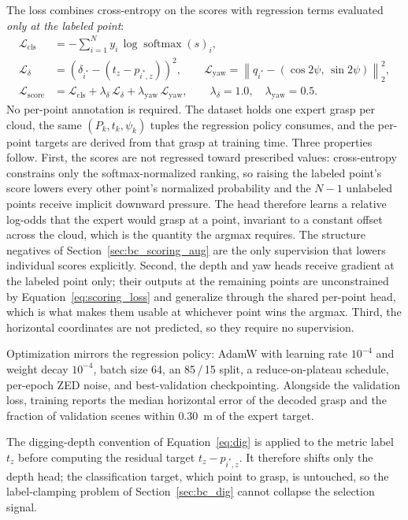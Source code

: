 The loss combines cross-entropy on the scores with regression terms evaluated
\emph{only at the labeled point}:
\begin{align}
  \mathcal{L}_{\mathrm{cls}} &= - \sum_{i=1}^{N} y_i \,
      \log \operatorname{softmax}(s)_i, \\
  \mathcal{L}_{\delta} &= \left( \delta_{i^*} - \left( t_z - p_{i^*, z} \right) \right)^2, \qquad
  \mathcal{L}_{\mathrm{yaw}} = \left\lVert q_{i^*} -
      \left( \cos 2\psi,\, \sin 2\psi \right) \right\rVert_2^2, \\
  \mathcal{L}_{\mathrm{score}} &= \mathcal{L}_{\mathrm{cls}}
      + \lambda_\delta \, \mathcal{L}_{\delta}
      + \lambda_{\mathrm{yaw}} \, \mathcal{L}_{\mathrm{yaw}},
  \qquad \lambda_\delta = 1.0, \quad \lambda_{\mathrm{yaw}} = 0.5 .
  \label{eq:scoring_loss}
\end{align}
No per-point annotation is required. The dataset holds one expert grasp per
cloud, the same $(P_k, t_k, \psi_k)$ tuples the regression policy consumes,
and the per-point targets are derived from that grasp at training time.
Three properties follow. First, the scores are not regressed toward
prescribed values: cross-entropy constrains only the softmax-normalized
ranking, so raising the labeled point's score lowers every other point's
normalized probability and the $N - 1$ unlabeled points receive implicit
downward pressure. The head therefore learns a relative log-odds that the
expert would grasp at a point, invariant to a constant offset across the
cloud, which is the quantity the argmax requires. The structure negatives of
Section~\ref{sec:bc_scoring_aug} are the only supervision that lowers
individual scores explicitly. Second, the depth and yaw heads receive
gradient at the labeled point only; their outputs at the remaining points
are unconstrained by Equation~\eqref{eq:scoring_loss} and generalize through
the shared per-point head, which is what makes them usable at whichever
point wins the argmax. Third, the horizontal coordinates are not predicted,
so they require no supervision.

Optimization mirrors the regression policy: AdamW with learning rate
$10^{-4}$ and weight decay $10^{-4}$, batch size 64, an 85\,/\,15 split, a
reduce-on-plateau schedule, per-epoch ZED noise, and best-validation
checkpointing. Alongside the validation loss, training reports the median
horizontal error of the decoded grasp and the fraction of validation scenes
within $0.30$~m of the expert target.

The digging-depth convention of Equation~\eqref{eq:dig} is applied to the
metric label $t_z$ before computing the residual target
$t_z - p_{i^*, z}$. It therefore shifts only the depth head; the
classification target, which point to grasp, is untouched, so the
label-clamping problem of Section~\ref{sec:bc_dig} cannot collapse the
selection signal.

